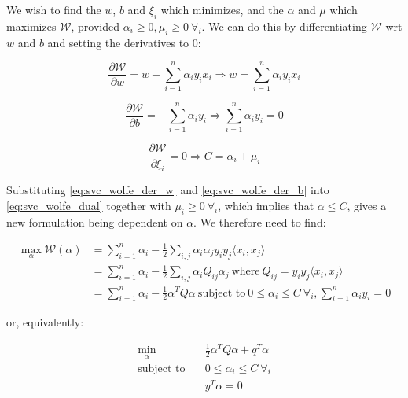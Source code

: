 We wish to find the $w$, $b$ and $\xi_i$ which minimizes, and the $\alpha$ and $\mu$ which maximizes $\mathcal{W}$, provided $\alpha_i\geq 0, \mu_i \geq 0 \ \forall_i$. We can do this by differentiating $\mathcal{W}$ wrt $w$ and $b$ and setting the derivatives to 0:

\begin{equation} \label{eq:svc_wolfe_der_w}
	\frac{\partial \mathcal{W}}{\partial w}=w-\sum_{i=1}^{n}\alpha_i y_i x_i \Rightarrow w=\sum_{i=1}^{n}\alpha_i y_i x_i
\end{equation}

\begin{equation} \label{eq:svc_wolfe_der_b}
	\frac{\partial \mathcal{W}}{\partial b}=-\sum_{i=1}^{n}\alpha_i y_i\Rightarrow\sum_{i=1}^{n}\alpha_i y_i=0
\end{equation}

\begin{equation} \label{eq:svc_wolfe_der_xi}
	\frac{\partial \mathcal{W}}{\partial\xi_i}=0\Rightarrow C=\alpha_i+\mu_i
\end{equation}

Substituting \ref{eq:svc_wolfe_der_w} and \ref{eq:svc_wolfe_der_b} into \ref{eq:svc_wolfe_dual} together with $\mu_i\geq 0 \ \forall_i$, which implies that $\alpha\leq C$, gives a new formulation being dependent on $\alpha$. We therefore need to find:

\begin{equation} \label{eq:svc_max_wolfe_dual}
	\begin{aligned}
    	\max_{\alpha} \mathcal{W}(\alpha) &= \sum_{i=1}^{n}\alpha_i - \frac{1}{2}\sum_{i,j}\alpha_i\alpha_j y_i y_j \langle x_i, x_j \rangle \\
    	&= \sum_{i=1}^{n}\alpha_i - \frac{1}{2}\sum_{i,j}\alpha_i Q_{ij}\alpha_j \ \text{where} \ Q_{ij} = y_i y_j \langle x_i, x_j \rangle \\
    	&= \sum_{i=1}^{n}\alpha_i - \frac{1}{2}\alpha^T Q\alpha \ \text{subject to} \ 0\leq\alpha_i\leq C \ \forall_i, \sum_{i=1}^{n}\alpha_i y_i=0 
	\end{aligned}
\end{equation}

or, equivalently:

\begin{equation} \label{eq:svc_min_wolfe_dual}
    \begin{aligned}
        \min_{\alpha} \quad & \frac{1}{2}\alpha^T Q\alpha+q^T\alpha \\
            \textrm{subject to} \quad & 0\leq\alpha_i\leq C \ \forall_i \\ & y^T\alpha=0
    \end{aligned}
\end{equation}

